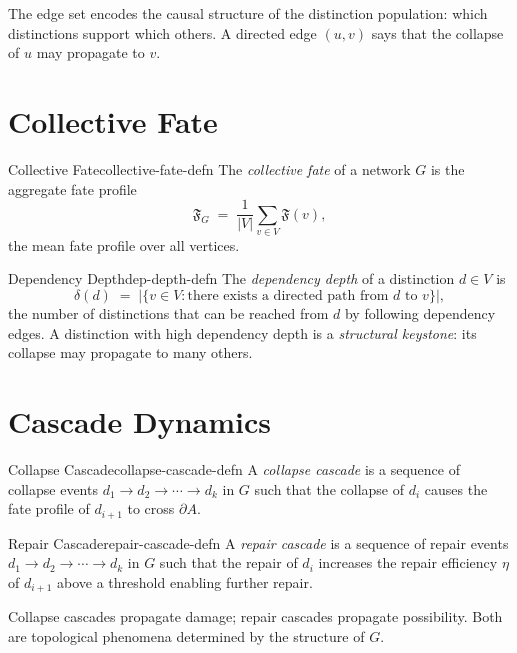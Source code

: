 \documentclass[12pt,twoside,openright]{book}
\newcommand{\fateMap}{\mathfrak{F}}
\newcommand{\repEff}{\eta}               %
\newcommand{\admRegion}{A}
\providecommand{\admRegion}{A}
\providecommand{\distNet}{G}
\providecommand{\distNetV}{V}
\providecommand{\collFate}{\mathfrak{F}_{G}}
\providecommand{\depDepth}[1]{\delta(#1)}
\begin{document}
The edge set encodes the causal structure of the distinction
population: which distinctions support which others. A
directed edge $(u,v)$ says that the collapse of $u$ may
propagate to $v$.

\section{Collective Fate}

\begin{definition}{Collective Fate}{collective-fate-defn}
The \emph{collective fate} of a network $\distNet$ is the
aggregate fate profile
\[
  \collFate
  \;=\;
  \frac{1}{|\distNetV|}
  \sum_{v\in\distNetV}\fateMap(v),
\]
the mean fate profile over all vertices.
\end{definition}

\begin{definition}{Dependency Depth}{dep-depth-defn}
The \emph{dependency depth} of a distinction $d\in\distNetV$
is
\[
  \depDepth{d}
  \;=\;
  \bigl|\{v\in\distNetV : \text{there exists a directed path from }d\text{ to }v\}\bigr|,
\]
the number of distinctions that can be reached from $d$ by
following dependency edges. A distinction with high dependency
depth is a \emph{structural keystone}: its collapse may
propagate to many others.
\end{definition}

\section{Cascade Dynamics}

\begin{definition}{Collapse Cascade}{collapse-cascade-defn}
A \emph{collapse cascade} is a sequence of collapse events
$d_1\to d_2\to\cdots\to d_k$ in $\distNet$ such that the
collapse of $d_i$ causes the fate profile of $d_{i+1}$ to
cross $\partial\admRegion$.
\end{definition}

\begin{definition}{Repair Cascade}{repair-cascade-defn}
A \emph{repair cascade} is a sequence of repair events
$d_1\to d_2\to\cdots\to d_k$ in $\distNet$ such that the
repair of $d_i$ increases the repair efficiency $\repEff$ of
$d_{i+1}$ above a threshold enabling further repair.
\end{definition}

Collapse cascades propagate damage; repair cascades propagate
possibility. Both are topological phenomena determined by the
structure of $\distNet$.
\end{document}
